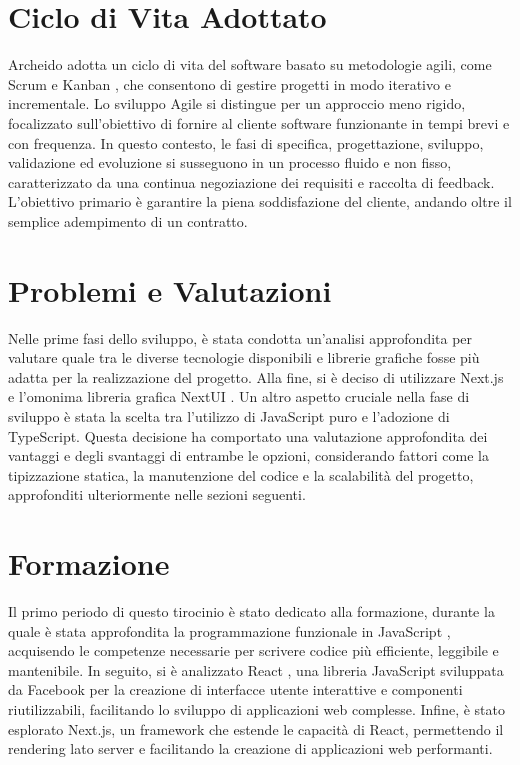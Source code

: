 \documentclass[target=bach,aauheader=,style=]{thud}
\begin{document}
\section{Ciclo di Vita Adottato}
Archeido adotta un ciclo di vita del software basato su metodologie agili, come Scrum \cite{scrumwiki2024} e Kanban \cite{kanbanwiki2024}, che consentono di gestire progetti in modo iterativo e incrementale. Lo sviluppo Agile si distingue per un approccio meno rigido, focalizzato sull'obiettivo di fornire al cliente software funzionante in tempi brevi e con frequenza. In questo contesto, le fasi di specifica, progettazione, sviluppo, validazione ed evoluzione si susseguono in un processo fluido e non fisso, caratterizzato da una continua negoziazione dei requisiti e raccolta di feedback. L'obiettivo primario è garantire la piena soddisfazione del cliente, andando oltre il semplice adempimento di un contratto.

\section{Problemi e Valutazioni}
Nelle prime fasi dello sviluppo, è stata condotta un'analisi approfondita per valutare quale tra le diverse tecnologie disponibili e librerie grafiche fosse più adatta per la realizzazione del progetto. Alla fine, si è deciso di utilizzare Next.js \cite{nextjs2024} e l'omonima libreria grafica NextUI \cite{nextui2024}. Un altro aspetto cruciale nella fase di sviluppo è stata la scelta tra l'utilizzo di JavaScript puro e l'adozione di TypeScript. Questa decisione ha comportato una valutazione approfondita dei vantaggi e degli svantaggi di entrambe le opzioni, considerando fattori come la tipizzazione statica, la manutenzione del codice e la scalabilità del progetto, approfonditi ulteriormente nelle sezioni seguenti.

\section{Formazione}
Il primo periodo di questo tirocinio è stato dedicato alla formazione, durante la quale è stata approfondita la programmazione funzionale in JavaScript \cite{knowthen2024}, acquisendo le competenze necessarie per scrivere codice più efficiente, leggibile e mantenibile. In seguito, si è analizzato React \cite{udemyreactredux2024}, una libreria JavaScript sviluppata da Facebook per la creazione di interfacce utente interattive e componenti riutilizzabili, facilitando lo sviluppo di applicazioni web complesse. Infine, è stato esplorato Next.js, un framework che estende le capacità di React, permettendo il rendering lato server e facilitando la creazione di applicazioni web performanti.
\end{document}
